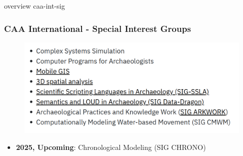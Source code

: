 \documentclass[t,aspectratio=169,xcolor=dvipsnames]{beamer}
\begin{document}
\begin{frame}{overview caa-int-sig}

    \frametitle{CAA International - Special Interest Groups}


    \begin{figure}
        \includegraphics[height=0.72\textheight]{figures/caa-sig.png}
    \end{figure}
        \begin{itemize}
            \item \textbf{2025, Upcoming}: Chronological Modeling (SIG CHRONO)
        \end{itemize}

\end{frame}

\end{document}

